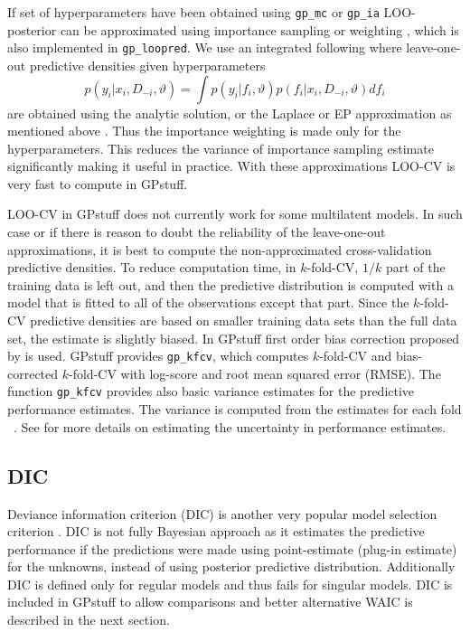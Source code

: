 \documentclass[twoside,11pt]{article}
\newcommand{\pkg}[1]{{\fontseries{b}\selectfont #1}}
\newcommand{\code}[1]{{\normalfont\texttt{#1}}}
\begin{document}
If set of hyperparameters have been obtained using \code{gp\_mc} or
\code{gp\_ia} LOO-posterior can be approximated using importance
sampling or weighting
\citep{Gelfand+Dey+Chang:1992,Vehtari+Lampinen:2002}, which is also
implemented in \code{gp\_loopred}. We use an integrated following \citet[][p. 40]{Vehtari:2001} where leave-one-out
predictive densities given hyperparameters
\begin{equation}
p(y_i|x_i,D_{-i},\vartheta)=\int
p(y_i|f_i,\vartheta)p(f_i|x_i,D_{-i},\vartheta)df_i 
\end{equation}
are obtained using the analytic solution, or the Laplace or EP
approximation as mentioned above \citep[see
also][]{Held+Schrodle+Rue:2010}. Thus the importance weighting is made
only for the hyperparameters. This reduces the variance of importance
sampling estimate significantly making it useful in practice. With
these approximations LOO-CV is very fast to compute in GPstuff.

LOO-CV in GPstuff does not currently work for some multilatent
models. In such case or if there is reason to doubt the reliability of
the leave-one-out approximations, it is best to compute the non-approximated
cross-validation predictive densities.  To reduce computation time, in
$k$-fold-CV, $1/k$ part of the training data is left out, and then the
predictive distribution is computed with a model that is fitted to all
of the observations except that part.  Since the $k$-fold-CV
predictive densities are based on smaller training data sets than the
full data set, the estimate is slightly biased. In \pkg{GPstuff} first
order bias correction proposed by \citet{Burman:1989} is used.
\pkg{GPstuff} provides \code{gp\_kfcv}, which computes $k$-fold-CV and
bias-corrected $k$-fold-CV with log-score and root mean squared error
(RMSE). The function \code{gp\_kfcv} provides also basic variance
estimates for the predictive performance estimates.  The variance is
computed from the estimates for each fold ~\citep[see,
e.g.,][]{Dietterich:1998}.  See
\citet{Vehtari+Lampinen:2002,Vehtari+Ojanen:2012} for more details on
estimating the uncertainty in performance estimates.

\subsection{DIC}

Deviance information criterion (DIC) is another very popular model
selection criterion
\citep[][]{Spiegelhalter+Best+Carlin+Linde:2002}. DIC is not fully
Bayesian approach as it estimates the predictive performance if the
predictions were made using point-estimate (plug-in estimate) for
the unknowns, instead of using posterior predictive distribution.
Additionally DIC is defined only for regular models and thus fails
for singular models. DIC is included in \pkg{GPstuff} to allow
comparisons and better alternative WAIC is described in the next
section.
\end{document}
